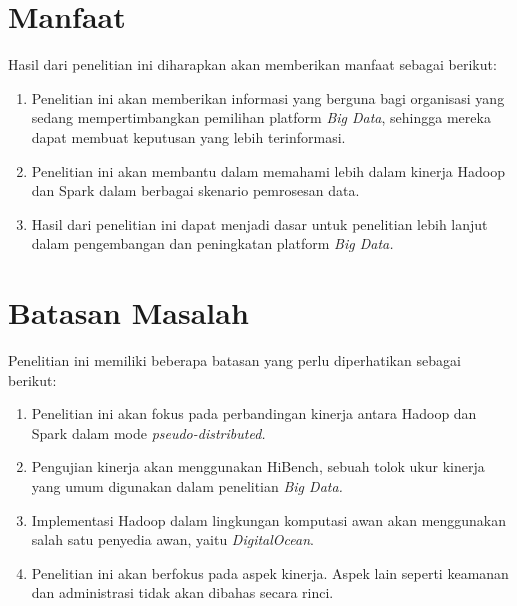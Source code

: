 \section{Manfaat}
Hasil dari penelitian ini diharapkan akan memberikan manfaat sebagai berikut:
\begin{enumerate}
	\item 
	Penelitian ini akan memberikan informasi yang berguna bagi organisasi yang sedang mempertimbangkan pemilihan platform \textit{Big Data}, sehingga mereka dapat membuat keputusan yang lebih terinformasi.	
	\item
	Penelitian ini akan membantu dalam memahami lebih dalam kinerja Hadoop dan Spark dalam berbagai skenario pemrosesan data.
	\item
	Hasil dari penelitian ini dapat menjadi dasar untuk penelitian lebih lanjut dalam pengembangan dan peningkatan platform \textit{Big Data.}
\end{enumerate}

\section{Batasan Masalah}
Penelitian ini memiliki beberapa batasan yang perlu diperhatikan sebagai berikut:
	\begin{enumerate}
		\item 
		Penelitian ini akan fokus pada perbandingan kinerja antara Hadoop dan Spark dalam mode \textit{pseudo-distributed.}
		\item
		Pengujian kinerja akan menggunakan HiBench, sebuah tolok ukur kinerja yang umum digunakan dalam penelitian \textit{Big Data.}
		\item
		Implementasi Hadoop dalam lingkungan komputasi awan akan menggunakan salah satu penyedia awan, yaitu \textit{DigitalOcean}.
		\item
		Penelitian ini akan berfokus pada aspek kinerja. Aspek lain seperti keamanan dan administrasi tidak akan dibahas secara rinci.
	\end{enumerate}

%
%
%
